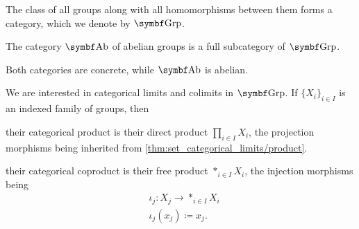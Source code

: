 \begin{definition}\label{def:category_of_groups}
  The class of all groups along with all homomorphisms between them forms a category, which we denote by \( \Bold{Grp} \).

  The category \( \Bold{Ab} \) of abelian groups is a full subcategory of \( \Bold{Grp} \).

  Both categories are concrete, while \( \Bold{Ab} \) is abelian.
\end{definition}

\begin{proposition}\label{thm:group_categorical_limits}
  We are interested in categorical limits and colimits in \( \Bold{Grp} \). If \( \{ X_i \}_{i \in I} \) is an indexed family of groups, then
  \begin{defenum}
     their categorical product is their direct product \( \prod_{i \in I} X_i \), the projection morphisms being inherited from \cref{thm:set_categorical_limits/product}.

     their categorical coproduct is their free product \( \ast_{i \in I} X_i \), the injection morphisms being
    \begin{align*}
      &\iota_j: X_j \to \ast_{i \in I} X_i \\
      &\iota_j(x_j) \coloneqq x_j.
    \end{align*}
  \end{defenum}
\end{proposition}

